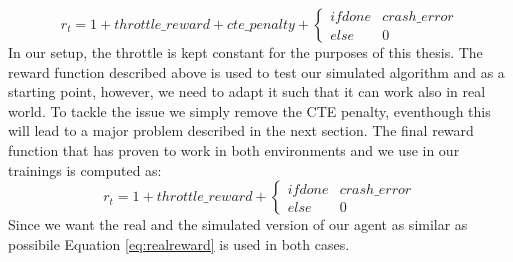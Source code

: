 \begin{equation}
  \label{eq:stdreward}
    r_t = 1 + throttle\_reward + cte\_penalty + \left\{\begin{matrix}
    if done & crash\_error \\ 
    else & 0  
    \end{matrix}\right.
\end{equation}
In our setup, the throttle is kept constant for the purposes of this thesis.
The reward function described above is used to test our simulated algorithm and as a starting point, however, we need to adapt it such that it can work also in real world. To tackle the issue we simply remove the CTE penalty, eventhough this will lead to a major problem described in the next section. The final reward function that has proven to work in both environments and we use in our trainings is computed as:
\begin{equation}
  \label{eq:realreward}
    r_t = 1 + throttle\_reward + \left\{\begin{matrix}
    if done & crash\_error \\ 
    else & 0  
    \end{matrix}\right.
\end{equation}
Since we want the real and the simulated version of our agent as similar as possibile Equation \ref{eq:realreward} is used in both cases.

